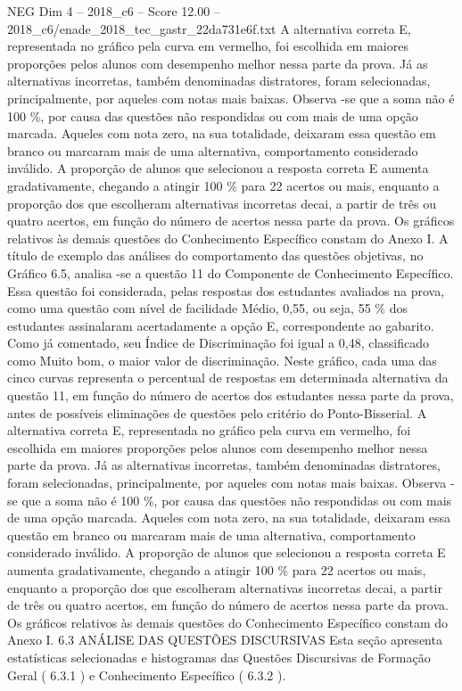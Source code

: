 \begin{textsample}{NEG Dim 4 – 2018\_c6 – Score 12.00 – 2018\_c6/enade\_2018\_tec\_gastr\_22da731e6f.txt}
A alternativa correta E, representada no gráfico pela curva em vermelho, foi escolhida em maiores proporções pelos alunos com desempenho melhor nessa parte da prova.
Já as alternativas incorretas, também denominadas distratores, foram selecionadas, principalmente, por aqueles com notas mais baixas.
Observa -se que a soma não é 100 \%, por causa das questões não respondidas ou com mais de uma opção marcada.
Aqueles com nota zero, na sua totalidade, deixaram essa questão em branco ou marcaram mais de uma alternativa, comportamento considerado inválido.
A proporção de alunos que selecionou a resposta correta E aumenta gradativamente, chegando a atingir 100 \% para 22 acertos ou mais, enquanto a proporção dos que escolheram alternativas incorretas decai, a partir de três ou quatro acertos, em função do número de acertos nessa parte da prova.
Os gráficos relativos às demais questões do Conhecimento Específico constam do Anexo I.
A título de exemplo das análises do comportamento das questões objetivas, no Gráfico 6.5, analisa -se a questão 11 do Componente de Conhecimento Específico.
Essa questão foi considerada, pelas respostas dos estudantes avaliados na prova, como uma questão com nível de facilidade Médio, 0,55, ou seja, 55 \% dos estudantes assinalaram acertadamente a opção E, correspondente ao gabarito.
Como já comentado, seu Índice de Discriminação foi igual a 0,48, classificado como Muito bom, o maior valor de discriminação.
Neste gráfico, cada uma das cinco curvas representa o percentual de respostas em determinada alternativa da questão 11, em função do número de acertos dos estudantes nessa parte da prova, antes de possíveis eliminações de questões pelo critério do Ponto-Bisserial.
A alternativa correta E, representada no gráfico pela curva em vermelho, foi escolhida em maiores proporções pelos alunos com desempenho melhor nessa parte da prova.
Já as alternativas incorretas, também denominadas distratores, foram selecionadas, principalmente, por aqueles com notas mais baixas.
Observa -se que a soma não é 100 \%, por causa das questões não respondidas ou com mais de uma opção marcada.
Aqueles com nota zero, na sua totalidade, deixaram essa questão em branco ou marcaram mais de uma alternativa, comportamento considerado inválido.
A proporção de alunos que selecionou a resposta correta E aumenta gradativamente, chegando a atingir 100 \% para 22 acertos ou mais, enquanto a proporção dos que escolheram alternativas incorretas decai, a partir de três ou quatro acertos, em função do número de acertos nessa parte da prova.
Os gráficos relativos às demais questões do Conhecimento Específico constam do Anexo I. 6.3 ANÁLISE DAS QUESTÕES DISCURSIVAS Esta seção apresenta estatísticas selecionadas e histogramas das Questões Discursivas de Formação Geral ( 6.3.1 ) e Conhecimento Específico ( 6.3.2 ).

\end{textsample}
